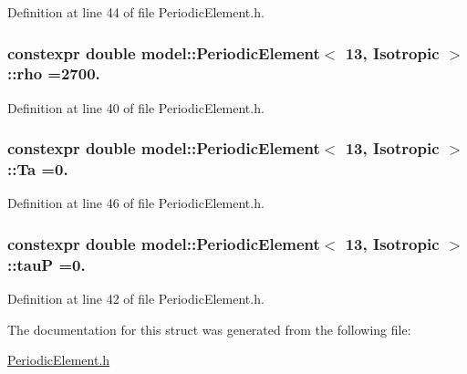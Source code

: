 Definition at line 44 of file Periodic\+Element.\+h.

\hypertarget{structmodel_1_1_periodic_element_3_0113_00_01_isotropic_01_4_ad69482015c0afd34be74ffc32beb3241}{}
\subsubsection[{rho}]{\setlength{\rightskip}{0pt plus 5cm}constexpr double {\bf model\+::\+Periodic\+Element}$<$ 13, {\bf Isotropic} $>$\+::rho =2700.\hspace{0.3cm}{\ttfamily [static]}}\label{structmodel_1_1_periodic_element_3_0113_00_01_isotropic_01_4_ad69482015c0afd34be74ffc32beb3241}


Definition at line 40 of file Periodic\+Element.\+h.

\hypertarget{structmodel_1_1_periodic_element_3_0113_00_01_isotropic_01_4_aba667693957fd32fe44ef7334aa20dc4}{}
\subsubsection[{Ta}]{\setlength{\rightskip}{0pt plus 5cm}constexpr double {\bf model\+::\+Periodic\+Element}$<$ 13, {\bf Isotropic} $>$\+::Ta =0.\hspace{0.3cm}{\ttfamily [static]}}\label{structmodel_1_1_periodic_element_3_0113_00_01_isotropic_01_4_aba667693957fd32fe44ef7334aa20dc4}


Definition at line 46 of file Periodic\+Element.\+h.

\hypertarget{structmodel_1_1_periodic_element_3_0113_00_01_isotropic_01_4_aaef289fd105d9ecc58273229a7d75b4c}{}
\subsubsection[{tau\+P}]{\setlength{\rightskip}{0pt plus 5cm}constexpr double {\bf model\+::\+Periodic\+Element}$<$ 13, {\bf Isotropic} $>$\+::tau\+P =0.\hspace{0.3cm}{\ttfamily [static]}}\label{structmodel_1_1_periodic_element_3_0113_00_01_isotropic_01_4_aaef289fd105d9ecc58273229a7d75b4c}


Definition at line 42 of file Periodic\+Element.\+h.



The documentation for this struct was generated from the following file\+:\begin{DoxyCompactItemize}
\item 
\hyperlink{_periodic_element_8h}{Periodic\+Element.\+h}\end{DoxyCompactItemize}
